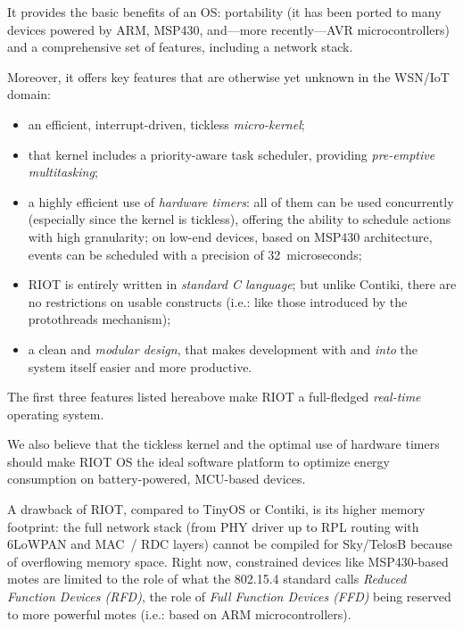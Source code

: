 \documentclass[a4paper,twoside]{article}
\begin{document}
It provides the basic benefits of an OS: portability (it has been ported
to many devices powered by ARM, MSP430, and---more recently---AVR
microcontrollers) and a comprehensive set of features, including
a network stack.

Moreover, it offers key features that are otherwise yet unknown in
the WSN/IoT domain:

\begin{itemize}

\item an efficient, interrupt-driven, tickless \emph{micro-kernel};

\item that kernel includes a priority-aware task scheduler, providing
      \emph{pre-emptive multitasking};

\item a highly efficient use of \emph{hardware timers}: all of them can be
      used concurrently (especially since the kernel is tickless), offering
      the ability to schedule actions with high granularity; on low-end
      devices, based on MSP430 architecture, events can be scheduled
      with a precision of 32~microseconds;

\item RIOT is entirely written in \emph{standard C language}; but unlike
      Contiki, there are no restrictions on usable constructs (i.e.: like
      those introduced by the protothreads mechanism);

\item a clean and \emph{modular design}, that makes development with and
      \emph{into} the system itself easier and more productive.

\end{itemize}

The first three features listed hereabove make RIOT a full-fledged
\emph{real-time} operating system.

We also believe that the tickless kernel and the optimal use of hardware
timers should make RIOT OS the ideal software platform to optimize energy
consumption on battery-powered, MCU-based devices.

A drawback of RIOT, compared to TinyOS or Contiki, is its higher memory
footprint: the full network stack (from PHY driver up to RPL routing with
\mbox{6LoWPAN} and MAC~/ RDC layers) cannot be compiled for Sky/TelosB
because of overflowing memory space. Right now, constrained devices like
MSP430-based motes are limited to the role of what the 802.15.4 standard
calls \emph{Reduced Function Devices (RFD)}, the role of \emph{Full
Function Devices (FFD)} being reserved to more powerful motes (i.e.:
based on ARM microcontrollers).
\end{document}
